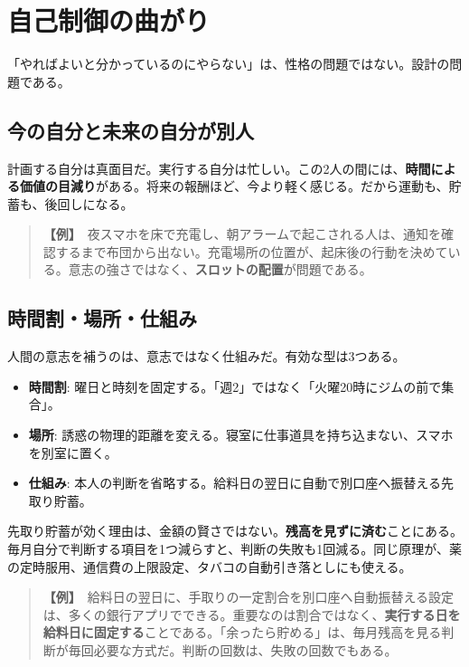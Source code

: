 \documentclass{article}
\begin{document}
\section{自己制御の曲がり}

「やればよいと分かっているのにやらない」は、性格の問題ではない。設計の問題である。

\subsection{今の自分と未来の自分が別人}

計画する自分は真面目だ。実行する自分は忙しい。この2人の間には、\textbf{時間による価値の目減り}がある。将来の報酬ほど、今より軽く感じる。だから運動も、貯蓄も、後回しになる。

\begin{quote}
\textbf{【例】}\ 夜スマホを床で充電し、朝アラームで起こされる人は、通知を確認するまで布団から出ない。充電場所の位置が、起床後の行動を決めている。意志の強さではなく、\textbf{スロットの配置}が問題である。
\end{quote}

\subsection{時間割・場所・仕組み}

人間の意志を補うのは、意志ではなく仕組みだ。有効な型は3つある。

\begin{itemize}
\item \textbf{時間割}: 曜日と時刻を固定する。「週2」ではなく「火曜20時にジムの前で集合」。
\item \textbf{場所}: 誘惑の物理的距離を変える。寝室に仕事道具を持ち込まない、スマホを別室に置く。
\item \textbf{仕組み}: 本人の判断を省略する。給料日の翌日に自動で別口座へ振替える先取り貯蓄。
\end{itemize}

先取り貯蓄が効く理由は、金額の賢さではない。\textbf{残高を見ずに済む}ことにある。毎月自分で判断する項目を1つ減らすと、判断の失敗も1回減る。同じ原理が、薬の定時服用、通信費の上限設定、タバコの自動引き落としにも使える。

\begin{quote}
\textbf{【例】}\ 給料日の翌日に、手取りの一定割合を別口座へ自動振替える設定は、多くの銀行アプリでできる。重要なのは割合ではなく、\textbf{実行する日を給料日に固定する}ことである。「余ったら貯める」は、毎月残高を見る判断が毎回必要な方式だ。判断の回数は、失敗の回数でもある。
\end{quote}
\end{document}

